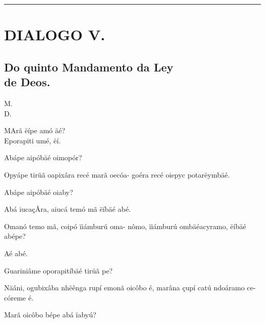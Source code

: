 \documentclass[openany,titlepage,12pt]{book}
\renewcommand{\chaptermark}[1]{\markboth{#1}{}}
\renewcommand{\sectionmark}[1]{\gdef\rightmark{#1}}
\newcommand{\comecalista}[5]{
    \hspace*{-11.7pt}
    \begin{minipage}[t]{0.08\linewidth}
        \flushright #1\\#2
    \end{minipage}
    \hspace{0pt}
    \begin{minipage}[t]{0.94\linewidth}
        \lettrine
        [findent =2pt, nindent=0pt,  lines=2]
        {#3}{#4}#5
    \end{minipage}
    \vspace*{-3pt}
}
\begin{document}
\vspace{2pt}
\par\noindent\rule{\textwidth}{0.4pt}
\unskip\vspace*{2pt}
\section{DIALOGO V.}
\unskip\vspace{2pt}
\subsection{Do quinto Mandamento da Ley \\de Deos.}

\chaptermark{Dialogo V.}
\sectionmark{Não matarás.}
\vspace*{10pt}

\comecalista{M.}{D.}{M}{A}
{rã ëípe amó äé?\\
 Eporapiti umé, ëí.
}

\begin{alternate}
    \item Abápe aipóbäé oimopór?
    \item Opyápe tirüã oapixâra recé marã oecóa-
        goéra recé oiepyc potarëymbäé.
    \item Abápe aipóbäé oiaby?
    \item Abá iucaçÂra, aiucá temó mã ëíbäé abé.
    \item Omanó temo mã, coipó ïiámburú oma-
        nômo, ïiámburú ombäéacyramo, ëíbäé
        abépe?
    \item Aé abé.
    \item Guariniâme oporapitíbäé tirüã pe?
    \item Näâni, ogubixâba nhëênga rupí emonã
        oicôbo é, marâna çupí catú ndoáramo ce-
        córeme é.
    \item Marã oicôbo bépe abá ïabyú?
\end{alternate}
\end{document}
